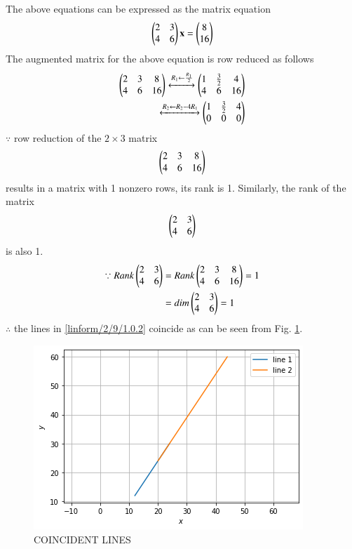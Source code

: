 \begin{enumerate}
The above equations can be expressed as the matrix equation
\begin{align}
\begin{pmatrix}2 & 3\\4 & 6\end{pmatrix} \mathbf{x} = \begin{pmatrix}8\\16\end{pmatrix}
\end{align}
%
The augmented matrix for the above equation is row reduced as follows
\begin{align}
\begin{pmatrix}2 & 3 & 8\\4 & 6 & 16 \end{pmatrix} 
\xleftrightarrow {R_1\leftarrow \frac{R_1}{2}}\begin{pmatrix}1 & \frac{3}{2} & 4\\4 & 6 & 16 \end{pmatrix}
\\
\xleftrightarrow {R_2\leftarrow R_2-4R_1}\begin{pmatrix}1 & \frac{3}{2} & 4 \\0 & 0 & 0\end{pmatrix}
\\
\end{align}
%
$\because$ row reduction of the $2\times 3$ matrix
%
\begin{align}
\begin{pmatrix}2 & 3 & 8\\4 & 6 & 16\end{pmatrix}
\end{align}
%
results in a matrix with 1 nonzero rows, its rank is 1. 
%
Similarly, the rank of the matrix 
\begin{align}
\begin{pmatrix}2 & 3 \\4 & 6 \end{pmatrix} 
\end{align}
%
is also 1.
%
\begin{align}
\because Rank \begin{pmatrix}2 & 3\\4 & 6\end{pmatrix} &= Rank\begin{pmatrix}2 & 3 & 8\\4 & 6 & 16\end{pmatrix}=1\nonumber\\
&= dim\begin{pmatrix}2 & 3\\4 & 6\end{pmatrix}=1
\end{align}
$\therefore$ the  lines in \eqref{linform/2/9/1.0.2} coincide as can be seen from Fig.     \ref{linform/2/9/fig:COINCIDENT LINES.}.

\begin{figure}[!ht]
    \centering
    \includegraphics[width=\columnwidth]{solutions/su2021/2/9/FIGURES/COINCIDENT_LINES.png}
    \caption{COINCIDENT LINES}
    \label{linform/2/9/fig:COINCIDENT LINES.}
\end{figure} 


\end{enumerate}
